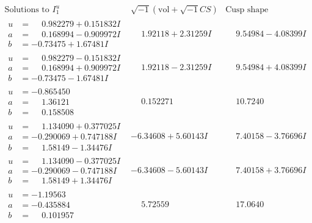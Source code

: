 \documentclass[1p]{elsarticle_modified}
\theoremstyle{definition}
\newcommand{\I}{\sqrt{-1}}
\begin{document}
$$\begin{array}{c|c|c}  
\text{Solutions to }I^u_{1}& \I (\text{vol} + \sqrt{-1}CS) & \text{Cusp shape}\\
 \hline 
\begin{aligned}
u &= \phantom{-}0.982279 + 0.151832 I \\
a &= \phantom{-}0.168994 - 0.909972 I \\
b &= -0.73475 + 1.67481 I\end{aligned}
 & \phantom{-}1.92118 + 2.31259 I & \phantom{-}9.54984 - 4.08399 I \\ \hline\begin{aligned}
u &= \phantom{-}0.982279 - 0.151832 I \\
a &= \phantom{-}0.168994 + 0.909972 I \\
b &= -0.73475 - 1.67481 I\end{aligned}
 & \phantom{-}1.92118 - 2.31259 I & \phantom{-}9.54984 + 4.08399 I \\ \hline\begin{aligned}
u &= -0.865450\phantom{ +0.000000I} \\
a &= \phantom{-}1.36121\phantom{ +0.000000I} \\
b &= \phantom{-}0.158508\phantom{ +0.000000I}\end{aligned}
 & \phantom{-}0.152271\phantom{ +0.000000I} & \phantom{-}10.7240\phantom{ +0.000000I} \\ \hline\begin{aligned}
u &= \phantom{-}1.134090 + 0.377025 I \\
a &= -0.290069 + 0.747188 I \\
b &= \phantom{-}1.58149 - 1.34476 I\end{aligned}
 & -6.34608 + 5.60143 I & \phantom{-}7.40158 - 3.76696 I \\ \hline\begin{aligned}
u &= \phantom{-}1.134090 - 0.377025 I \\
a &= -0.290069 - 0.747188 I \\
b &= \phantom{-}1.58149 + 1.34476 I\end{aligned}
 & -6.34608 - 5.60143 I & \phantom{-}7.40158 + 3.76696 I \\ \hline\begin{aligned}
u &= -1.19563\phantom{ +0.000000I} \\
a &= -0.435884\phantom{ +0.000000I} \\
b &= \phantom{-}0.101957\phantom{ +0.000000I}\end{aligned}
 & \phantom{-}5.72559\phantom{ +0.000000I} & \phantom{-}17.0640\phantom{ +0.000000I} \\ \hline\begin{aligned}

\end{aligned}
\end{array}$$
\end{document}

